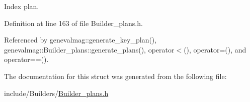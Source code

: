 Index plan. 



Definition at line 163 of file Builder\_\-plans.h.

Referenced by genevalmag::generate\_\-key\_\-plan(), genevalmag::Builder\_\-plans::generate\_\-plans(), operator$<$(), operator=(), and operator==().

The documentation for this struct was generated from the following file:\begin{CompactItemize}
\item 
include/Builders/\hyperlink{Builder__plans_8h}{Builder\_\-plans.h}\end{CompactItemize}
